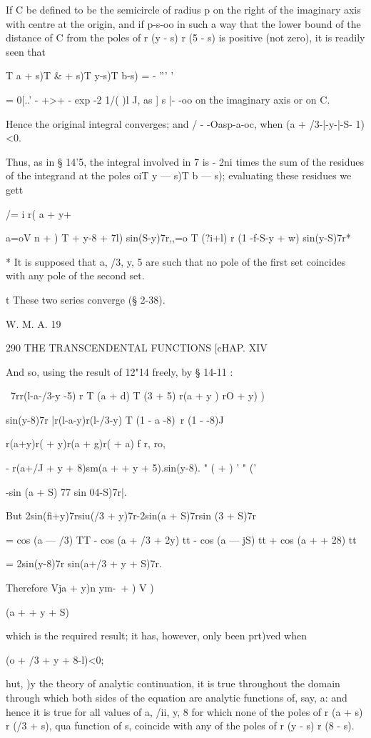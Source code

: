 If C be defined to be the semicircle of radius p on the right of the
imaginary axis with centre at the origin, and if p-s-oo in such a way
that the lower bound of the distance of C from the poles of r (y - s)
r (5 - s) is positive (not zero), it is readily seen that

T a + s)T \& + s)T y-s)T b-s) = - ''' '

= 0[..' - +>+ - exp -2 1/( )l J, as ] s |- -oo on the imaginary axis
or on C.

Hence the original integral converges; and / - -Oasp-a-oc, when (a +
/3-|-y-|-S- 1)<0.

Thus, as in § 14'5, the integral involved in 7 is - 2ni times the sum
of the residues of the integrand at the poles oiT y — s)T b — s);
evaluating these residues we gett

/= i r( a + y+%

a=oV n + ) T + y-8 + 7l) sin(S-y)7r,,=o T (?i+l) r (1 -f-S-y + w)
sin(y-S)7r*

* It is supposed that a, /3, y, 5 are such that no pole of the first
set coincides with any pole of the second set.

t These two series converge (§ 2-38).

W. M. A. 19

290 THE TRANSCENDENTAL FUNCTIONS [cHAP. XIV

And so, using the result of 12"14 freely, by § 14-11 :

\ 7rr(l-a-/3-y -5) r T (a + d) T (3 + 5) r(a + y ) rO + y) )

sin(y-8)7r |r(l-a-y)r(l-/3-y) T (1 - a -8)~r (1 - -8)J

r(a+y)r( + y)r(a + g)r( + a) f r, ro,

- r(a+/J + y + 8)sm(a + + y + 5).sin(y-8). " ( + ) ' " ('

-sin (a + S) 77 sin 04-S)7r|.

But 2sin(fi+y)7rsiu(/3 + y)7r-2sin(a + S)7rsin (3 + S)7r

= cos (a — /3) TT - cos (a + /3 + 2y) tt - cos (a — jS) tt + cos (a +
+ 28) tt

= 2sin(y-8)7r sin(a+/3 + y + S)7r.

Therefore Vja + y)n ym-\ + ) V )

 (a + + y + S)

which is the required result; it has, however, only been prt)ved when

 (o + /3 + y + 8-l)<0;

hut, )y the theory of analytic continuation, it is true throughout the
domain through which both sides of the equation are analytic functions
of, say, a: and hence it is true for all values of a, /ii, y, 8 for
which none of the poles of r (a + s) r (/3 + s), qua function of s,
coincide with any of the poles of r (y - s) r (8 - s).


